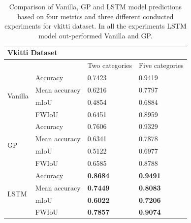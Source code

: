 	\begin{table}
		\centering
		\begin{tabular}{|l|l|l|l|} 
			\hline
			\multicolumn{4}{|l|}{\textbf{Vkitti Dataset}}                                 \\ 
			\hline
			&               & Two categories  & Five categories  \\ 
			\hline
			\multirow{4}{*}{Vanilla} & Accuracy      & 0.7423          & 0.9419           \\ 
			\cline{2-4}
			& Mean accuracy & 0.6216          & 0.7797           \\ 
			\cline{2-4}
			& mIoU          & 0.4854          & 0.6884           \\ 
			\cline{2-4}
			& FWIoU         & 0.6451          & 0.8959           \\ 
			\hline
			\multirow{4}{*}{GP}      & Accuracy      & 0.7606          & 0.9329           \\ 
			\cline{2-4}
			& Mean accuracy & 0.6341          & 0.7878           \\ 
			\cline{2-4}
			& mIoU          & 0.5122          & 0.6977           \\ 
			\cline{2-4}
			& FWIoU         & 0.6585          & 0.8788           \\ 
			\hline
			\multirow{4}{*}{LSTM}    & Accuracy      & \textbf{0.8684} & \textbf{0.9491}  \\ 
			\cline{2-4}
			& Mean accuracy & \textbf{0.7449} & \textbf{0.8083}  \\ 
			\cline{2-4}
			& mIoU          & \textbf{0.6022} & \textbf{0.7206}  \\ 
			\cline{2-4}
			& FWIoU         & \textbf{0.7857} & \textbf{0.9074}  \\
			\hline
		\end{tabular}
		\caption{Comparison of Vanilla, GP and LSTM model predictions based on four metrics and three different conducted experiments for vkitti dataset. In all the experiments LSTM model out-performed Vanilla and GP.}
		\label{table:hype2}
	\end{table}

	
